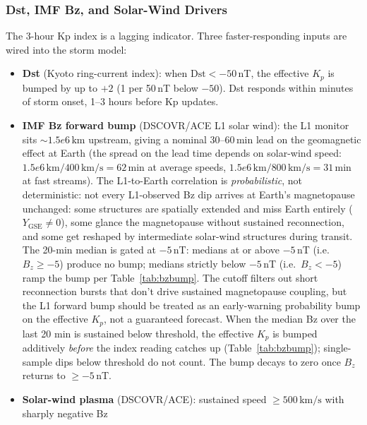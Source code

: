 \documentclass[11pt,a4paper]{article}
\newcommand{\SI}[2]{#1\,\text{#2}}
\begin{document}
\subsubsection{Dst, IMF Bz, and Solar-Wind Drivers}\label{sec:fast-storm-drivers}

The 3-hour Kp index is a lagging indicator.  Three faster-responding
inputs are wired into the storm model:

\begin{itemize}[nosep]
  \item \textbf{Dst} (Kyoto ring-current index): when $\text{Dst} < -50$\,nT,
        the effective $K_p$ is bumped by up to $+2$ (1 per 50\,nT below $-50$).
        Dst responds within minutes of storm onset, 1--3 hours before Kp updates.
  \item \textbf{IMF Bz forward bump} (DSCOVR/ACE L1 solar wind): the
        L1 monitor sits ${\sim}\SI{1.5e6}{km}$ upstream, giving a
        nominal 30--60\,min lead on the geomagnetic effect at
        Earth (the spread on the lead time depends on solar-wind
        speed: $\SI{1.5e6}{km} / \SI{400}{km/s} = 62$\,min at
        average speeds, $\SI{1.5e6}{km} / \SI{800}{km/s} = 31$\,min
        at fast streams).  The L1-to-Earth correlation is
        \emph{probabilistic}, not deterministic: not every L1-observed
        Bz dip arrives at Earth's magnetopause unchanged: some
        structures are spatially extended and miss Earth entirely
        ($Y_{\text{GSE}} \neq 0$), some glance the magnetopause
        without sustained reconnection, and some get reshaped by
        intermediate solar-wind structures during transit.  The
        20-min median is gated at $-5$\,nT: medians at or above
        $-5$\,nT (i.e.\ $B_z \geq -5$) produce no bump; medians
        strictly below $-5$\,nT (i.e.\ $B_z < -5$) ramp the bump per
        Table~\ref{tab:bzbump}.  The cutoff filters out short
        reconnection bursts that don't drive sustained magnetopause
        coupling, but the L1 forward bump should be treated as an
        early-warning probability bump on the effective $K_p$, not
        a guaranteed forecast.  When the median Bz over the last
        20 min is sustained below threshold, the effective $K_p$ is
        bumped additively \emph{before} the index reading catches
        up (Table~\ref{tab:bzbump}); single-sample dips below
        threshold do not count.  The bump decays to zero once
        $B_z$ returns to $\geq -5$\,nT.
  \item \textbf{Solar-wind plasma} (DSCOVR/ACE): sustained speed
        $\geq \SI{500}{km/s}$ with sharply negative Bz

\end{itemize}
\end{document}
